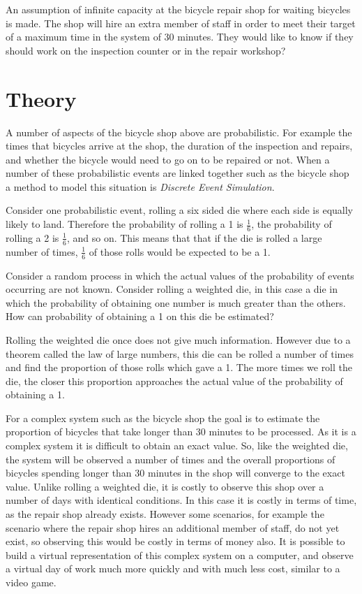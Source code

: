An assumption of infinite capacity at the bicycle repair shop
for waiting bicycles is made.
The shop will hire an extra member of staff in order to meet their target of a
maximum time in the system of 30 minutes. They would like to know if they
should work on the inspection counter or in the repair workshop?

\section{Theory}\label{sec:discrete_event_simulation_theory}

A number of aspects of the bicycle shop above are
probabilistic. For example the
times that bicycles arrive at the shop, the duration of the inspection and
repairs, and whether the bicycle would need to go on to be repaired or not.
When a number of these probabilistic events are linked together
such as the bicycle shop a method to model this situation is
\textit{Discrete Event Simulation}.

Consider one probabilistic event, rolling a six sided die where each side is
equally likely to land.  Therefore the probability of rolling a 1 is
\(\frac{1}{6}\), the probability of rolling a 2 is \(\frac{1}{6}\), and so on.
This means that that if the die is rolled a large number of times,
\(\frac{1}{6}\) of those rolls would be expected to be a 1.

Consider a random process in which the actual values of the probability
of events occurring are not known. Consider rolling a weighted die, in this case a
die in which the probability of obtaining one number is much greater than the
others. How can probability of obtaining a 1 on this die be estimated?

Rolling the weighted die once does not give much information.
However due to a theorem called the law of large numbers,
this die can be rolled a number of times
and find the proportion of those rolls which gave a 1. The more times we roll
the die, the closer this proportion approaches the actual value of the
probability of obtaining a 1.

For a complex system such as the bicycle shop the goal is to estimate the
proportion of bicycles that take longer than 30 minutes to be processed. As it
is a complex system it is difficult to obtain an exact value. So,
like the weighted die, the system will be observed a number of times and
the overall proportions
of bicycles spending longer than 30 minutes in the shop will converge to
the exact value.
Unlike rolling a weighted die, it is costly to observe this shop over a
number of days with identical conditions. In this case it is costly in terms of
time, as the repair shop already exists. However some scenarios, for example the
scenario where the repair shop hires an additional member of staff, do not yet
exist, so observing this would be costly in terms of money also.
It is possible to build a virtual representation of this complex system on a
computer, and observe a virtual day of work much more quickly and with much less
cost, similar to a video game.

